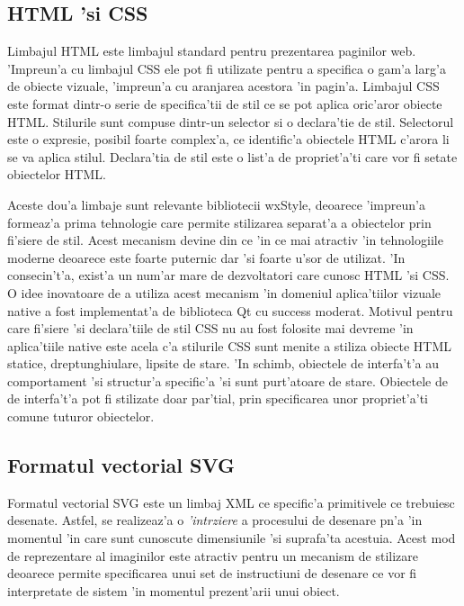 \subsection{HTML 'si CSS}

Limbajul HTML este limbajul standard pentru prezentarea paginilor web. 'Impreun'a cu limbajul CSS ele pot fi utilizate pentru a specifica o gam'a larg'a de obiecte vizuale, 'impreun'a cu aranjarea acestora 'in pagin'a. Limbajul CSS este format dintr-o serie de specifica'tii de stil ce se pot aplica oric'aror obiecte HTML. Stilurile sunt compuse dintr-un selector si o declara'tie de stil. Selectorul este o expresie, posibil foarte complex'a, ce identific'a obiectele HTML c'arora li se va aplica stilul. Declara'tia de stil este o list'a de propriet'a'ti care vor fi setate obiectelor HTML.

\medskip

Aceste dou'a limbaje sunt relevante bibliotecii wxStyle, deoarece 'impreun'a formeaz'a prima tehnologie care permite stilizarea separat'a a obiectelor prin fi'siere de stil. Acest mecanism devine din ce 'in ce mai atractiv 'in tehnologiile moderne deoarece este foarte puternic dar 'si foarte u'sor de utilizat. 'In consecin't'a, exist'a un num'ar mare de dezvoltatori care cunosc HTML 'si CSS. O idee inovatoare de a utiliza acest mecanism 'in domeniul aplica'tiilor vizuale native a fost implementat'a de biblioteca Qt cu success moderat. Motivul pentru care fi'siere 'si declara'tiile de stil CSS nu au fost folosite mai devreme 'in aplica'tiile native este acela c'a stilurile CSS sunt menite a stiliza obiecte HTML statice, dreptunghiulare, lipsite de stare. 'In schimb, obiectele de interfa't'a au comportament 'si structur'a specific'a 'si sunt purt'atoare de stare. Obiectele de de interfa't'a pot fi stilizate doar par'tial, prin specificarea unor propriet'a'ti comune tuturor obiectelor.

\subsection{Formatul vectorial SVG}

Formatul vectorial SVG este un limbaj XML ce specific'a primitivele ce trebuiesc desenate. Astfel, se realizeaz'a o \emph{'int{\ia}rziere} a procesului de desenare p{\ia}n'a 'in momentul 'in care sunt cunoscute dimensiunile 'si suprafa'ta acestuia. Acest mod de reprezentare al imaginilor este atractiv pentru un mecanism de stilizare deoarece permite specificarea unui set de instructiuni de desenare ce vor fi interpretate de sistem 'in momentul prezent'arii unui obiect.

